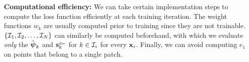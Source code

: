 {\bf Computational efficiency:} We can take certain implementation steps to compute the loss function efficiently at each training iteration. The weight functions $w_k$ are usually computed prior to training since they are not trainable. $\{\mathcal{I}_1, \mathcal{I}_2, \dots, \mathcal{I}_N\}$ can similarly be computed beforehand, with which we evaluate \emph{only} the $\hat{\boldsymbol{\psi}}_k$ and $\mathbf{s}_{k}^{_{\text{div}}}$ for $k \in \mathcal{I}_i$ for every $\mathbf{x}_i$. Finally, we can avoid computing $e_1$ on points that belong to a single patch.
%
\pagebreak
